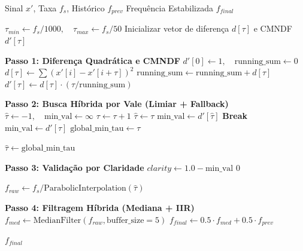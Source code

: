 \documentclass[11pt, a4paper]{article}
\theoremstyle{plain}
\theoremstyle{definition}
\begin{document}
\begin{algorithm}[H]
\caption{Estimativa de $f_0$ via Algoritmo YIN com Filtragem Híbrida}
\label{alg:pitch}
\begin{algorithmic}[1]
\Require Sinal $x'$, Taxa $f_s$, Histórico $f_{prev}$
\Ensure Frequência Estabilizada $f_{final}$

\State $\tau_{min} \gets f_s / 1000, \quad \tau_{max} \gets f_s / 50$
\State Inicializar vetor de diferença $d[\tau]$ e CMNDF $d'[\tau]$

\State \textbf{Passo 1: Diferença Quadrática e CMNDF}
\State $d'[0] \gets 1, \quad \text{running\_sum} \gets 0$
    \State $d[\tau] \gets \sum (x'[i] - x'[i+\tau])^2$
    \State $\text{running\_sum} \gets \text{running\_sum} + d[\tau]$
    \State $d'[\tau] \gets d[\tau] \cdot (\tau / \text{running\_sum})$
\EndFor

\State \textbf{Passo 2: Busca Híbrida por Vale (Limiar + Fallback)}
\State $\hat{\tau} \gets -1, \quad \text{min\_val} \gets \infty$
     
         
            \State $\tau \gets \tau + 1$
        \EndWhile
        \State $\hat{\tau} \gets \tau$
        \State $\text{min\_val} \gets d'[\hat{\tau}]$
        \State \textbf{Break}
    \EndIf
        \State $\text{min\_val} \gets d'[\tau]$ 
        \State $\text{global\_min\_tau} \gets \tau$
    \EndIf
\EndFor

    \State $\hat{\tau} \gets \text{global\_min\_tau}$ 
\EndIf

\State \textbf{Passo 3: Validação por Claridade}
\State $clarity \gets 1.0 - \text{min\_val}$
 
    \State \Return $0$
\EndIf

\State $f_{raw} \gets f_s / \text{ParabolicInterpolation}(\hat{\tau})$

\State \textbf{Passo 4: Filtragem Híbrida (Mediana + IIR)}
\State $f_{med} \gets \text{MedianFilter}(f_{raw}, \text{buffer\_size}=5)$
\State $f_{final} \gets 0.5 \cdot f_{med} + 0.5 \cdot f_{prev}$ 

\State \Return $f_{final}$
\end{algorithmic}
\end{algorithm}
\end{document}

